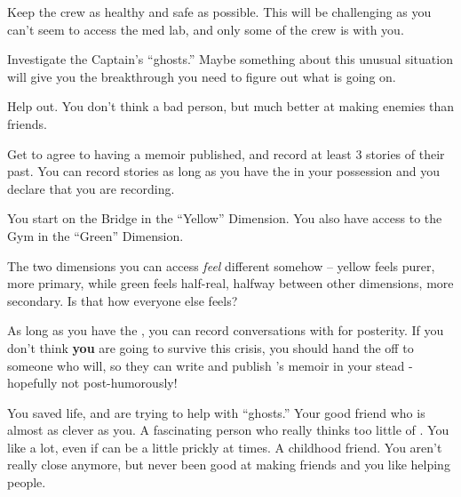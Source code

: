 \documentclass[char]{TMFHope}
\begin{document}
\begin{itemz}[Goals]
	\item Keep the crew as healthy and safe as possible. This will be challenging as you can't seem to access the med lab, and only some of the crew is with you.
	\item Investigate the Captain's ``ghosts.'' Maybe something about this unusual situation will give you the breakthrough you need to figure out what is going on.
	\item Help \cDip{} out. You don't think \cDip{\they} \cDip{\are} a bad person, but \cDip{\they} \cDip{\are} much better at making enemies than friends.
	\item Get \cEng{} to agree to having a memoir published, and record at least 3 stories of their past. You can record stories as long as you have the \iVoice{\MYname{}} in your possession and you declare that you are recording.
\end{itemz}

\begin{itemz}[Notes]
	\item You start on the Bridge in the ``Yellow'' Dimension. You also have access to the Gym in the ``Green'' Dimension. 
	\item The two dimensions you can access {\em feel} different somehow -- yellow feels purer, more primary, while green feels half-real, halfway between other dimensions, more secondary.  Is that how everyone else feels?
	\item As long as you have the \iVoice{}, you can record conversations with \cEng{} for posterity. If you don't think \textbf{you} are going to survive this crisis, you should hand the \iVoice{} off to someone who will, so they can write and publish \cEng{}'s memoir in your stead - hopefully not post-humorously!
\end{itemz}

\begin{contacts}
	\contact{\cCap{}} You saved \cCap{\their} life, and are trying to help \cCap{\them} with \cCap{\their} ``ghosts.''
	\contact{\cSci{}} Your good friend who is almost as clever as you.
	\contact{\cEng{}} A fascinating person who really thinks too little of \cEng{\themself}. You like \cEng{} a lot, even if \cEng{\they} can be a little prickly at times.
	\contact{\cDip{}} A childhood friend. You aren't really close anymore, but \cDip{\they} \cDip{\have} never been good at making friends and you like helping people.
\end{contacts}
\end{document}
